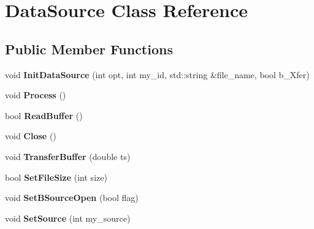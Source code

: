 \hypertarget{classDataSource}{\section{Data\-Source Class Reference}
\label{classDataSource}
}
\subsection*{Public Member Functions}
\begin{DoxyCompactItemize}
\item 
\hypertarget{classDataSource_a9f1b177ac9c1dd57914db767619b5822}{void {\bfseries Init\-Data\-Source} (int opt, int my\-\_\-id, std\-::string \&file\-\_\-name, bool b\-\_\-\-Xfer)}\label{classDataSource_a9f1b177ac9c1dd57914db767619b5822}

\item 
\hypertarget{classDataSource_a8ea5f4f2cbe86012fdd43733d09b2636}{void {\bfseries Process} ()}\label{classDataSource_a8ea5f4f2cbe86012fdd43733d09b2636}

\item 
\hypertarget{classDataSource_ad55439b380b81458ad35ed5e5e37fe0d}{bool {\bfseries Read\-Buffer} ()}\label{classDataSource_ad55439b380b81458ad35ed5e5e37fe0d}

\item 
\hypertarget{classDataSource_a4f9bac52cab619be316b2cf4c998e364}{void {\bfseries Close} ()}\label{classDataSource_a4f9bac52cab619be316b2cf4c998e364}

\item 
\hypertarget{classDataSource_a1be5defac4e9aee640da5ba64e512265}{void {\bfseries Transfer\-Buffer} (double ts)}\label{classDataSource_a1be5defac4e9aee640da5ba64e512265}

\item 
\hypertarget{classDataSource_a539cdce23a048e988bb08410c4fc057d}{bool {\bfseries Set\-File\-Size} (int size)}\label{classDataSource_a539cdce23a048e988bb08410c4fc057d}

\item 
\hypertarget{classDataSource_abdc306298f8a3342d34a33a6d79102ba}{void {\bfseries Set\-B\-Source\-Open} (bool flag)}\label{classDataSource_abdc306298f8a3342d34a33a6d79102ba}

\item 
\hypertarget{classDataSource_afd317dc578f55c9caccdaee6495df9e2}{void {\bfseries Set\-Source} (int my\-\_\-source)}\label{classDataSource_afd317dc578f55c9caccdaee6495df9e2}


\end{DoxyCompactItemize}
